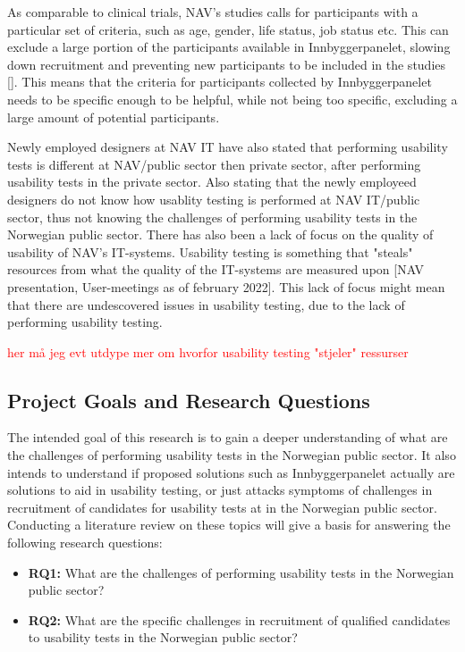 As comparable to clinical trials, NAV's studies calls for participants with a particular set of criteria, such as age, gender, life status, job status etc. This can exclude a large portion of the participants available in Innbyggerpanelet, slowing down recruitment and preventing new participants to be included in the studies [\cite{nc_2020}]. This means that the criteria for participants collected by Innbyggerpanelet needs to be specific enough to be helpful, while not being too specific, excluding a large amount of potential participants.

Newly employed designers at NAV IT have also stated that performing usability tests is different at NAV/public sector then private sector, after performing usability tests in the private sector. Also stating that the newly employeed designers do not know how usablity testing is performed at NAV IT/public sector, thus not knowing the challenges of performing usability tests in the Norwegian public sector. There has also been a lack of focus on the quality of usability of NAV's IT-systems. Usability testing is something that "steals" resources from what the quality of the IT-systems are measured upon [NAV presentation, User-meetings as of february 2022]. This lack of focus might mean that there are undescovered issues in usability testing, due to the lack of performing usability testing.

\textcolor{red}{her må jeg evt utdype mer om hvorfor usability testing "stjeler" ressurser}

\subsection{Project Goals and Research Questions}
The intended goal of this research is to gain a deeper understanding of what are the challenges of performing usability tests in the Norwegian public sector. It also intends to understand if proposed solutions such as Innbyggerpanelet actually are solutions to aid in usability testing, or just attacks symptoms of challenges in recruitment of candidates for usability tests at in the Norwegian public sector. Conducting a literature review on these topics will give a basis for answering the following research questions: 

\begin{itemize}
    \item \textbf{RQ1:} What are the challenges of performing usability tests in the Norwegian public sector?
    \item \textbf{RQ2:} What are the specific challenges in recruitment of qualified candidates to usability tests in the Norwegian public sector?
\end{itemize}


